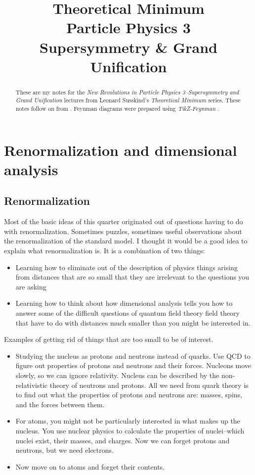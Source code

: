 \documentclass[]{article}
\title{Theoretical Minimum\\Particle Physics 3\\Supersymmetry \& Grand Unification}
\author{}
\begin{document}
\maketitle

\begin{abstract}
	These are my notes for the \emph{New Revolutions in Particle Physics 3--Supersymmetry and Grand Unification}\cite{susskind2010supersymmetry} lectures from Leonard Susskind's \emph{Theoretical Minimum} series\cite{susskind2007theoretical}. These notes follow on from \cite{susskind2010standard}. Feynman diagrams were prepared using \emph{TikZ-Feynman} \cite{ellis2016tikz}.
\end{abstract}

\tableofcontents
\listoffigures
\listoftables
\listoftheorems

\section{Renormalization  and dimensional analysis}\label{sect:renormalization}

\subsection{Renormalization}

Most of the basic ideas of this quarter originated out of questions having to do with renormalization. Sometimes puzzles, sometimes useful observations about the renormalization of the standard model. I thought it would be a good idea to explain what renormalization is. It  is a combination of two things:
\begin{itemize}
	\item Learning how to eliminate out of the description of physics things arising from distances that are so small that they are irrelevant to the questions you are asking
	\item Learning how to think about how dimensional analysis tells you how to answer some of the difficult questions of quantum field theory field theory that have to do with distances much smaller than you might be interested in.
\end{itemize}

Examples of getting rid of things that are too small to be of interest.
\begin{itemize}
	\item Studying the nucleus as protons and neutrons instead of quarks. Use QCD to figure out properties of protons and neutrons and their forces. Nucleons move slowly, so we can ignore relativity. Nucleus can be described by the non-relativistic theory of neutrons and protons. All we need from quark theory is to find out what the properties of protons and neutrons are: masses, spins, and the forces between them.
	\item For atoms, you might not be particularly interested in what makes up the nucleus. You use nuclear physics to calculate the properties of nuclei--which nuclei exist, their masses, and charges. Now we can forget protons and neutrons, but we need electrons.
	\item Now move on to atoms and forget their contents.
\end{itemize}
\end{document}
